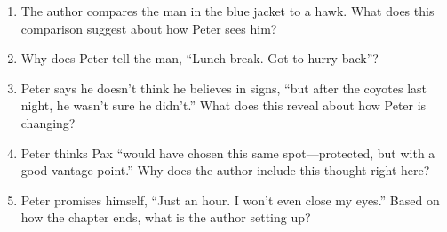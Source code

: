 \documentclass[11pt]{article}
\begin{document}
\begin{enumerate}
  \vspace{8pt}
  \item The author compares the man in the blue jacket to a hawk. What does this comparison suggest about how Peter sees him?
  \vspace{0.85in}
  \item Why does Peter tell the man, ``Lunch break. Got to hurry back''?
  \vspace{8pt}
  \item Peter says he doesn't think he believes in signs, ``but after the coyotes last night, he wasn't sure he didn't.'' What does this reveal about how Peter is changing?
  \vspace{0.85in}
  \item Peter thinks Pax ``would have chosen this same spot---protected, but with a good vantage point.'' Why does the author include this thought right here?
  \vspace{0.85in}
  \item Peter promises himself, ``Just an hour. I won't even close my eyes.'' Based on how the chapter ends, what is the author setting up?
  \vspace{0.85in}
\end{enumerate}
\end{document}
